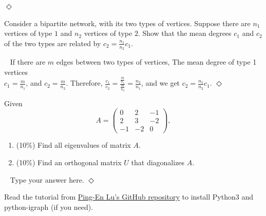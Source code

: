 \documentclass[12pt]{article}
\newcommand {\bsolution}{\noindent {\em Solution:} \ }
\newcommand{\esolution}{\hfill $\Diamond$ \\ \vspace{.3cm}}
\begin{document}
\esolution



Consider a bipartite network, with its two types of vertices. Suppose there are $n_1$ vertices of type $1$ and $n_2$ vertices of type $2$. Show that the mean degrees $c_1$ and $c_2$ of the two types are related by $c_2=\frac{n_1}{n_2}c_1$.

\bsolution
If there are $m$ edges between two types of vertices, The mean degree of type 1 vertices\\[0.6em]
$c_1=\frac{m}{n_1}$, and $c_2=\frac{m}{n_2}$. Therefore, 
$\frac{c_1}{c_2}=\frac{\frac{m}{n_1}}{\frac
	{m}{n_2}}=\frac{n_2}{n_1}$, and we get 
$c_2=\frac{n_1}{n_2}c_1$.
\esolution

Given 
	\[A=
		\begin{pmatrix}
			0 & 2 & -1 \\
			2 & 3 & -2 \\
			-1 & -2 & 0
		\end{pmatrix},
	\]

\begin{enumerate}[label=(\alph*)]
	\item (10\%) Find all eigenvalues of matrix $A$.
	\item (10\%) Find an orthogonal matrix $U$ that diagonalizes $A$.
\end{enumerate}

\bsolution
Type your answer here.
\esolution



\newpage
Read the tutorial from \href{https://github.com/PingEnLu/Network-Science-COM530500/tree/master/Network_Science_Python_iGraph_Tutorial}{Ping-En Lu's GitHub repository} to install Python3 and python-igraph (if you need).
\end{document}
